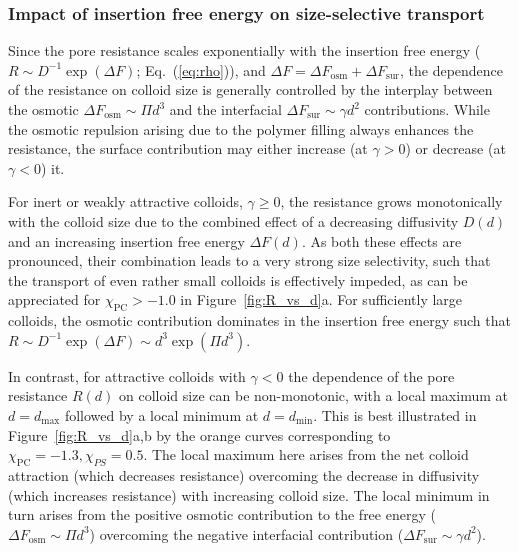 \documentclass[12pt, a4paper]{article}
\newcommand\todo[1]{\textcolor{red}{#1}}
\begin{document}


\subsubsection{Impact of insertion free energy on size-selective transport}

Since the pore resistance scales exponentially with the insertion free energy ($R \sim D^{-1}\exp (\Delta F)$; Eq.~(\ref{eq:rho})), and $\Delta F =\Delta F_{\text{osm}} + \Delta F_{\text{sur}}$, the dependence of the resistance on colloid size is generally controlled by the interplay between
the osmotic $\Delta F_{\text{osm}} \sim \Pi d^3$ and the interfacial $\Delta F_{\text{sur}} \sim \gamma d^2$ contributions. 
While the osmotic repulsion arising due to the polymer filling always enhances the resistance, the surface contribution may either increase (at $\gamma > 0$) or decrease (at $\gamma<0$) it.

For inert or weakly attractive colloids, $\gamma \geq 0$, the resistance grows monotonically with the colloid size due to the combined effect of a decreasing diffusivity $D(d)$ and an increasing insertion free energy  $\Delta F(d)$.
As both these effects are pronounced, their combination leads to a very strong size selectivity, such that the transport of even rather small colloids is effectively impeded, as can be appreciated for $\chi_{\text{PC}} > -1.0$ in Figure~\ref{fig:R_vs_d}a.
For sufficiently large colloids, the osmotic contribution dominates in the insertion free energy such that $R \sim D^{-1} \exp (\Delta F) \sim d^3 \exp (\Pi d^3)$.

In contrast, for attractive colloids with $\gamma <0$ the dependence of the pore resistance $R(d)$ on colloid size can be non-monotonic, with a local maximum at $d=d_{\text{max}}$ followed by a local minimum at $d=d_{\text{min}}$.
This is best illustrated in Figure~\ref{fig:R_vs_d}a,b by the orange curves corresponding to $\chi_{\text{PC}} = -1.3, \chi_{PS}=0.5$.
The local maximum here arises from the net colloid attraction (which decreases resistance) overcoming the decrease in diffusivity (which increases resistance) with increasing colloid size.
The local minimum in turn arises from the positive osmotic contribution to the free energy ($\Delta F_{\text{osm}} \sim \Pi d^3$) overcoming the negative interfacial contribution ($\Delta F_{\text{sur}} \sim \gamma d^2$).
\end{document}
